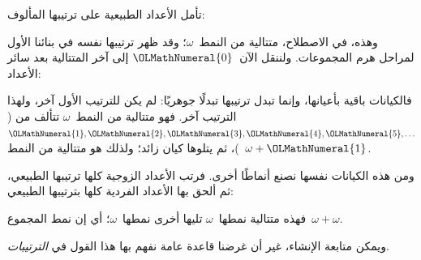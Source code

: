 \documentclass[../../../include/open-logic-section]{subfiles}
\begin{document}

تأمل الأعداد الطبيعية على ترتيبها المألوف:
\begin{center}
\end{center}
وهذه، في الاصطلاح، متتالية من النمط~$\omega$؛ وقد ظهر ترتيبها نفسه في
بنائنا الأول لمراحل هرم المجموعات. ولننقل الآن~$\OLMathNumeral{0}$ إلى آخر المتتالية
بعد سائر الأعداد:
\begin{center}
\end{center}
فالكيانات باقية بأعيانها، وإنما تبدل ترتيبها تبدلًا جوهريًا: لم يكن
للترتيب الأول آخر، ولهذا الترتيب آخر. فهو متتالية من النمط~$\omega$
تتألف من ($\OLMathNumeral{1}, \OLMathNumeral{2}, \OLMathNumeral{3}, \OLMathNumeral{4}, \OLMathNumeral{5}, \ldots$)، ثم يتلوها كيان زائد؛ ولذلك هو
متتالية من النمط~$\omega+\OLMathNumeral{1}$.

ومن هذه الكيانات نفسها نصنع أنماطًا أخرى. فرتب الأعداد الزوجية كلها
ترتيبها الطبيعي، ثم ألحق بها الأعداد الفردية كلها بترتيبها الطبيعي:
\begin{center}
\end{center}
فهذه متتالية نمطها~$\omega$ تليها أخرى نمطها~$\omega$؛ أي إن نمط
المجموع~$\omega+\omega$.

ويمكن متابعة الإنشاء، غير أن غرضنا قاعدة عامة نفهم بها هذا القول في
\emph{الترتيبات}.
\end{document}
